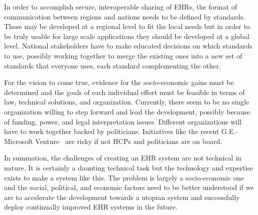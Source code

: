 \documentclass[14pt]{article}
\begin{document}

In order to accomplish secure, interoperable sharing of EHRs, the format of communication between regions and nations needs to be defined by standards. These may be developed at a regional level to fit the local needs but in order to be truly usable for large scale applications they should be developed at a global level. National stakeholders have to make educated decisions on which standards to use, possibly working together to merge the existing ones into a new set of standards that everyone uses, each standard complementing the other.

For the vision to come true, evidence for the socio-economic gains must be determined and the goals of each individual effort must be feasible in terms of law, technical solutions, and organization. Currently, there seem to be no single
organization willing to step forward and lead the development, possibly because of funding, power, and legal interpretation issues. Different organizations will have to work together backed by politicians. Initiatives like the recent G.E.-Microsoft Venture~\cite{Bits} are risky if not HCPs and politicians are on board.

In summation, the challenges of creating an EHR system are not technical in nature. It is certainly a daunting technical task but the technology and expertise exists to make a system like this. The problem is largely a socio-economic one and the social, political, and economic factors need to be better understood if we are to accelerate the development towards a utopian system and successfully deploy continually improved EHR systems in the future.

\newpage
\printglossaries
\newpage

\begin{appendix}
\end{appendix}



 
 
\end{document}
